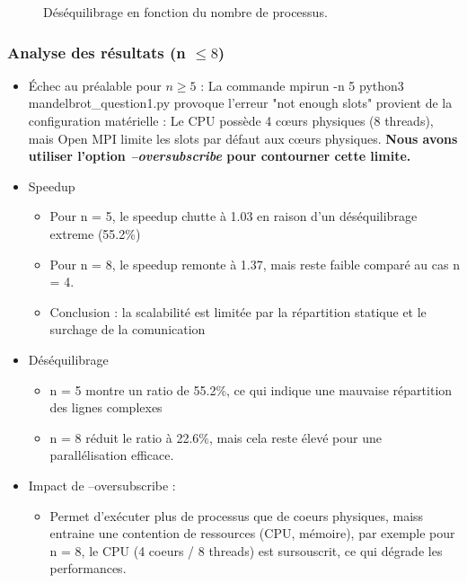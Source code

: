 \documentclass[a4paper,13pt]{book}
\begin{document}
\begin{figure}[ht]
  \centering
  \caption{Déséquilibrage en fonction du nombre de processus.}
  \label{fig:desequilibre}
\end{figure}
\subsubsection{Analyse des résultats (n $\leq 8$)}
\begin{itemize}
\item Échec au préalable pour $n\geq 5$ : La commande mpirun -n 5 python3 mandelbrot\_question1.py provoque l’erreur "not enough slots" provient de la configuration matérielle : Le CPU possède 4 cœurs physiques (8 threads), mais Open MPI limite les slots par défaut aux cœurs physiques. \textbf{Nous avons utiliser l'option \emph{--oversubscribe} pour contourner cette limite.}
\item Speedup
\begin{itemize}
  \item Pour n = 5, le speedup chutte à 1.03 en raison d'un déséquilibrage extreme (55.2\%)
  \item Pour n = 8, le speedup remonte à 1.37, mais reste faible comparé au cas n = 4.
  \item Conclusion : la scalabilité est limitée par la répartition statique et le surchage de la comunication
\end{itemize}
\item Déséquilibrage 
\begin{itemize}
  \item n = 5 montre un ratio de 55.2\%, ce qui indique une mauvaise répartition des lignes complexes 
  \item n = 8 réduit le ratio à 22.6\%, mais cela reste élevé pour une parallélisation efficace.
\end{itemize}
\item Impact de --oversubscribe : 
\begin{itemize}
  \item Permet d'exécuter plus de processus que de coeurs physiques, maiss entraine une contention de ressources (CPU, mémoire), par exemple pour n = 8, le CPU (4 coeurs / 8 threads) est sursouscrit, ce qui dégrade les performances.
\end{itemize}
\end{itemize}
\clearpage
\end{document}
